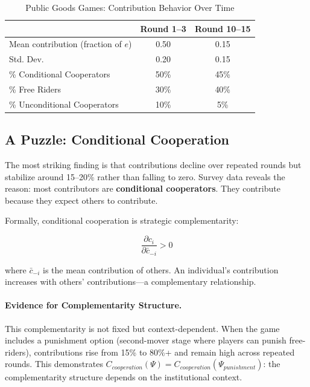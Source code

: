 \documentclass[12pt,oneside]{book}
\begin{document}
\begin{table}[htbp]
\centering
\caption{Public Goods Games: Contribution Behavior Over Time}
\label{tab:public-goods}
\begin{tabular}{@{}lcc@{}}
\toprule
& \textbf{Round 1--3} & \textbf{Round 10--15} \\
\midrule
Mean contribution (fraction of $e$) & 0.50 & 0.15 \\
Std. Dev.                           & 0.20 & 0.15 \\
\% Conditional Cooperators          & 50\% & 45\% \\
\% Free Riders                       & 30\% & 40\% \\
\% Unconditional Cooperators        & 10\% & 5\% \\
\bottomrule
\end{tabular}
\end{table}

\subsection{A Puzzle: Conditional Cooperation}

The most striking finding is that contributions decline over repeated rounds but stabilize around
15--20\% rather than falling to zero. Survey data reveals the reason: most contributors are
\textbf{conditional cooperators}. They contribute because they expect others to contribute.

Formally, conditional cooperation is strategic complementarity:

\begin{equation}
\frac{\partial c_i}{\partial \bar{c}_{-i}} > 0
\label{eq:conditional-coop}
\end{equation}

where $\bar{c}_{-i}$ is the mean contribution of others. An individual's contribution increases
with others' contributions—a complementary relationship.

\paragraph{Evidence for Complementarity Structure.}

This complementarity is not fixed but context-dependent. When the game includes a punishment option
(second-mover stage where players can punish free-riders), contributions rise from 15\% to 80\%+
and remain high across repeated rounds. This demonstrates $C_{cooperation}(\Psi) = C_{cooperation}(\Psi_{punishment})$:
the complementarity structure depends on the institutional context.
\end{document}
